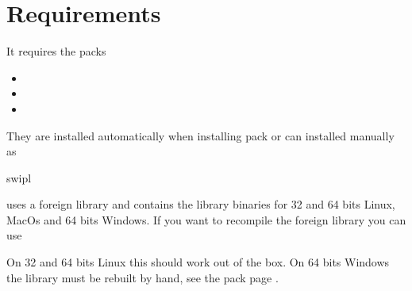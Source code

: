 \documentclass[letterpaper,10pt,english]{sphinxmanual}
\begin{document}
\begin{sphinxVerbatim}[commandchars=\\\{\}]
 
\end{sphinxVerbatim}


\section{Requirements}
\label{\detokenize{index:requirements}}
\sphinxAtStartPar
It requires the packs
\begin{itemize}
\item {} 
\sphinxAtStartPar
{}

\item {} 
\sphinxAtStartPar
{}

\item {} 
\sphinxAtStartPar
{}

\end{itemize}

\sphinxAtStartPar
They are installed automatically when installing pack  or can installed manually as

\begin{sphinxVerbatim}[commandchars=\\\{\}]
swipl
\end{sphinxVerbatim}

\sphinxAtStartPar
{} uses a foreign library and contains the library binaries for 32 and 64 bits Linux, MacOs and 64 bits Windows. If you want to recompile the foreign library you can use

\begin{sphinxVerbatim}[commandchars=\\\{\}]
 
\end{sphinxVerbatim}

\sphinxAtStartPar
On 32 and 64 bits Linux this should work out of the box. On 64 bits Windows the library must be rebuilt by hand, see the pack page .
\end{document}
